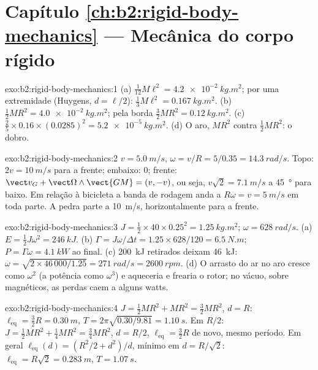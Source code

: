 \section*{Capítulo \ref{ch:b2:rigid-body-mechanics} --- Mecânica do corpo rígido}

\begin{solution}{exo:b2:rigid-body-mechanics:1}
(a) $\tfrac1{12}M\ell^2 = \qty{4.2e-2}{kg.m^2}$; por uma extremidade (Huygens,
$d = \ell/2$): $\tfrac13M\ell^2 = \qty{0.167}{kg.m^2}$. (b) $\tfrac12MR^2 =
\qty{4.0e-2}{kg.m^2}$; pela borda $\tfrac32MR^2 = \qty{0.12}{kg.m^2}$.
(c) $\tfrac25 \times 0.16 \times (0.0285)^2 = \qty{5.2e-5}{kg.m^2}$. (d) O
aro, $MR^2$ contra $\tfrac12MR^2$: o dobro.
\end{solution}

\begin{solution}{exo:b2:rigid-body-mechanics:2}
$v = \qty{5.0}{m/s}$, $\omega = v/R = 5/0.35 = \qty{14.3}{rad/s}$. Topo:
$2v = \qty{10}{m/s}$ para a frente; embaixo: $0$; frente: $\vect v_G + \vect\Omega
\wedge\vect{GM} = (v, -v)$, ou seja, $v\sqrt2 = \qty{7.1}{m/s}$ a
\qty{45}{\degree} para baixo. Em relação à bicicleta a banda de rodagem anda a
$R\omega = v = \qty{5}{m/s}$ em toda parte. A pedra parte a \qty{10}{m/s},
horizontalmente para a frente.
\end{solution}

\begin{solution}{exo:b2:rigid-body-mechanics:3}
$J = \tfrac12 \times 40 \times 0.25^2 = \qty{1.25}{kg.m^2}$; $\omega = \qty{628}{rad/s}$.
(a) $E = \tfrac12J\omega^2 = \qty{246}{kJ}$. (b) $\Gamma = J\omega/\Delta t =
1.25 \times 628/120 = \qty{6.5}{N.m}$; $P = \Gamma\omega = \qty{4.1}{kW}$ ao final.
(c) \qty{200}{kJ} retirados deixam \qty{46}{kJ}: $\omega = \sqrt{2 \times 46\,000/1.25}
= \qty{271}{rad/s} = \qty{2600}{rpm}$. (d) O arrasto do ar no aro cresce como
$\omega^2$ (a potência como $\omega^3$) e aqueceria e frearia o rotor; no
vácuo, sobre  magnéticos, as perdas caem a alguns watts.
\end{solution}

\begin{solution}{exo:b2:rigid-body-mechanics:4}
$J = \tfrac12MR^2 + MR^2 = \tfrac32MR^2$, $d = R$: $\ell_{\text{eq}} = \tfrac32R
= \qty{0.30}{m}$, $T = 2\pi\sqrt{0.30/9.81} = \qty{1.10}{s}$. Em $R/2$: $J =
\tfrac12MR^2 + \tfrac14MR^2 = \tfrac34MR^2$, $d = R/2$, $\ell_{\text{eq}} =
\tfrac32R$ de novo, mesmo período. Em geral $\ell_{\text{eq}}(d) = (R^2/2 +
d^2)/d$, mínimo em $d = R/\sqrt2$: $\ell_{\text{eq}} = R\sqrt2 = \qty{0.283}{m}$,
$T = \qty{1.07}{s}$.
\end{solution}

